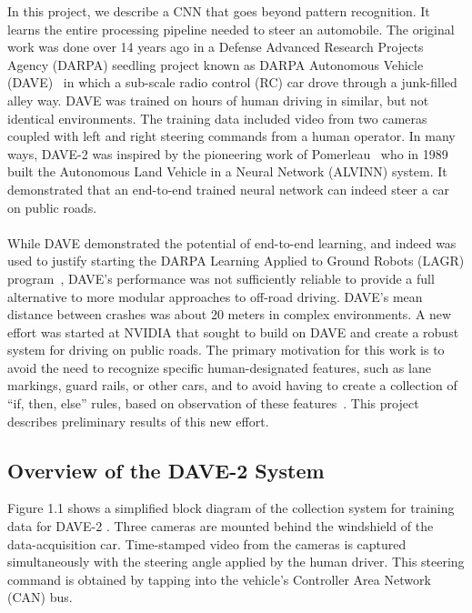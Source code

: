 In this project, we describe a CNN that goes beyond pattern recognition. It learns the entire processing pipeline needed to steer an automobile. The original work was done over 14 years ago in a Defense Advanced Research Projects Agency (DARPA) seedling project known as DARPA Autonomous Vehicle (DAVE)~\cite{lecun2004dave} in which a sub-scale radio control (RC) car drove through a junk-filled alley way. DAVE was trained on hours of human driving in similar, but not identical environments. The training data included video from two cameras coupled with left and right steering commands from a human operator. In many ways, DAVE-2 was inspired by the pioneering work of Pomerleau~\cite{pomerleau1989alvinn} who in 1989 built the Autonomous Land Vehicle in a Neural Network (ALVINN) system. It demonstrated that an end-to-end trained neural network can indeed steer a car on public roads. \\\\
While DAVE demonstrated the potential of end-to-end learning, and indeed was used to justify starting the DARPA Learning Applied to Ground Robots (LAGR) program~\cite{bojarski2016end}, DAVE’s performance was not sufficiently reliable to provide a full alternative to more modular approaches to off-road driving. DAVE’s mean distance between crashes was about 20 meters in complex environments. A new effort was started at NVIDIA that sought to build on DAVE and create a robust system for driving on public roads. The primary motivation for this work is to avoid the need to recognize specific human-designated features, such as lane markings, guard rails, or other cars, and to avoid having to create a collection of “if, then, else” rules, based on observation of these features~\cite{wang2001trajectory}. This project describes preliminary results of this new effort.


\subsection{Overview of the DAVE-2 System}

 Figure 1.1 shows a simplified block diagram of the collection system for training data for DAVE-2 . Three cameras are mounted behind the windshield of the data-acquisition car. Time-stamped video from the cameras is captured simultaneously with the steering angle applied by the human driver. This steering command is obtained by tapping into the vehicle’s Controller Area Network (CAN) bus.\\
 
